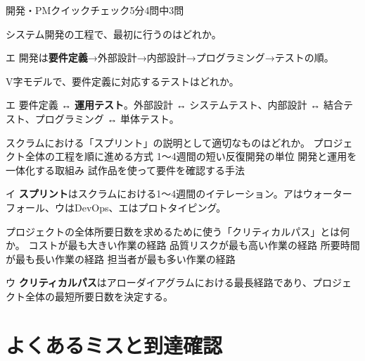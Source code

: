\begin{timeattack}{開発・PMクイックチェック}{5分}{4問中3問}

\begin{itpmon}[\diffbadge{基}]{システム開発の工程で、最初に行うのはどれか。}
\end{itpmon}
\begin{kaisetsu}{エ}
開発は\textbf{要件定義}→外部設計→内部設計→プログラミング→テストの順。
\end{kaisetsu}

\begin{itpmon}[\diffbadge{基}]{V字モデルで、要件定義に対応するテストはどれか。}
\end{itpmon}
\begin{kaisetsu}{エ}
要件定義 ↔ \textbf{運用テスト}。外部設計 ↔ システムテスト、内部設計 ↔ 結合テスト、プログラミング ↔ 単体テスト。
\end{kaisetsu}

\begin{itpmon}[\diffbadge{標}]{スクラムにおける「スプリント」の説明として適切なものはどれか。}
\sentakushi
  {プロジェクト全体の工程を順に進める方式}
  {1〜4週間の短い反復開発の単位}
  {開発と運用を一体化する取組み}
  {試作品を使って要件を確認する手法}
\end{itpmon}
\begin{kaisetsu}{イ}
\textbf{スプリント}はスクラムにおける1〜4週間のイテレーション。アはウォーターフォール、ウはDevOps、エはプロトタイピング。
\end{kaisetsu}

\begin{itpmon}[\diffbadge{標}]{プロジェクトの全体所要日数を求めるために使う「クリティカルパス」とは何か。}
\sentakushi
  {コストが最も大きい作業の経路}
  {品質リスクが最も高い作業の経路}
  {所要時間が最も長い作業の経路}
  {担当者が最も多い作業の経路}
\end{itpmon}
\begin{kaisetsu}{ウ}
\textbf{クリティカルパス}はアローダイアグラムにおける最長経路であり、プロジェクト全体の最短所要日数を決定する。
\end{kaisetsu}

\end{timeattack}

\section{よくあるミスと到達確認}


